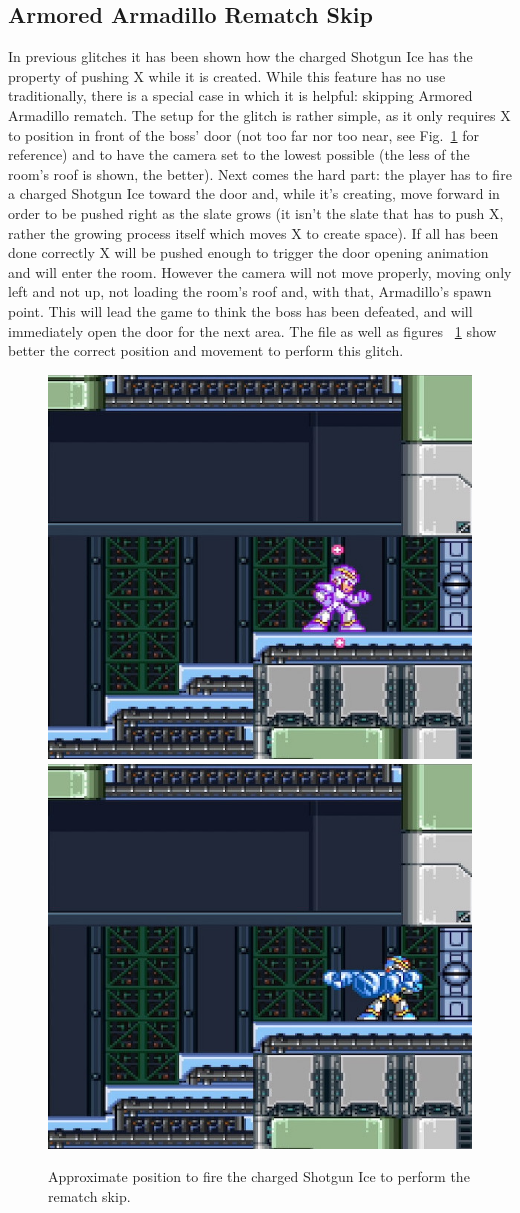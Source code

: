\subsection{Armored Armadillo Rematch Skip}\label{Armadillo_skip}
In previous glitches it has been shown how the charged Shotgun Ice has the property of pushing X while it is created. While this feature has no use traditionally, there is a special case in which it is helpful: skipping Armored Armadillo rematch. The setup for the glitch is rather simple, as it only requires X to position in front of the boss' door (not too far nor too near, see Fig.~\ref{Armadillo_skip_positioning} for reference) and to have the camera set to the lowest possible (the less of the room's roof is shown, the better). Next comes the hard part: the player has to fire a charged Shotgun Ice toward the door and, while it's creating, move forward in order to be pushed right as the slate grows (it isn't the slate that has to push X, rather the growing process itself which moves X to create space). If all has been done correctly X will be pushed enough to trigger the door opening animation and will enter the room. However the camera will not move properly, moving only left and not up, not loading the room's roof and, with that, Armadillo's spawn point. This will lead the game to think the boss has been defeated, and will immediately open the door for the next area. The file  as well as figures ~\ref{Armadillo_skip_positioning} show better the correct position and movement to perform this glitch.
\begin{figure}[htp]
	\centering
	\includegraphics[width=0.45\linewidth]{figures/X1/Miscs/Dillo_skip_1.jpg}
	\includegraphics[width=0.45\linewidth]{figures/X1/Miscs/Dillo_skip_2.jpg}
	\caption{Approximate position to fire the charged Shotgun Ice to perform the rematch skip.}
	\label{Armadillo_skip_positioning}
\end{figure}

